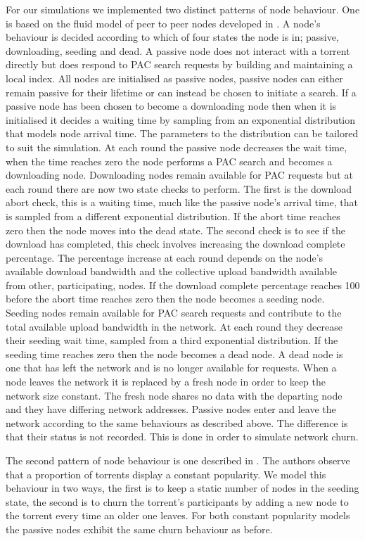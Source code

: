     For our simulations we implemented two distinct patterns of node behaviour. One is based on the fluid model of peer to peer nodes developed in \cite{Qiu2004,Guo2007}. A node's behaviour is decided according to which of four states the node is in; passive, downloading, seeding and dead. A passive node does not interact with a torrent directly but does respond to PAC search requests by building and maintaining a local index. All nodes are initialised as passive nodes, passive nodes can either remain passive for their lifetime or can instead be chosen to initiate a search. If a passive node has been chosen to become a downloading node then when it is initialised it decides a waiting time by sampling from an exponential distribution that models node arrival time. The parameters to the distribution can be tailored to suit the simulation. At each round the passive node decreases the wait time, when the time reaches zero the node performs a PAC search and becomes a downloading node. Downloading nodes remain available for PAC requests but at each round there are now two state checks to perform. The first is the download abort check, this is a waiting time, much like the passive node's arrival time, that is sampled from a different exponential distribution. If the abort time reaches zero then the node moves into the dead state. The second check is to see if the download has completed, this check involves increasing the download complete percentage. The percentage increase at each round depends on the node's available download bandwidth and the collective upload bandwidth available from other, participating, nodes. If the download complete percentage reaches 100 before the abort time reaches zero then the node becomes a seeding node. Seeding nodes remain available for PAC search requests and contribute to the total available upload bandwidth in the network. At each round they decrease their seeding wait time, sampled from a third exponential distribution. If the seeding time reaches zero then the node becomes a dead node. A dead node is one that has left the network and is no longer available for requests. When a node leaves the network it is replaced by a fresh node in order to keep the network size constant. The fresh node shares no data with the departing node and they have differing network addresses. Passive nodes enter and leave the network according to the same behaviours as described above. The difference is that their status is not recorded. This is done in order to simulate network churn.

    The second pattern of node behaviour is one described in \cite{Zhang2011}. The authors observe that a proportion of torrents display a constant popularity. We model this behaviour in two ways, the first is to keep a static number of nodes in the seeding state, the second is to churn the torrent's participants by adding a new node to the torrent every time an older one leaves. For both constant popularity models the passive nodes exhibit the same churn behaviour as before.


